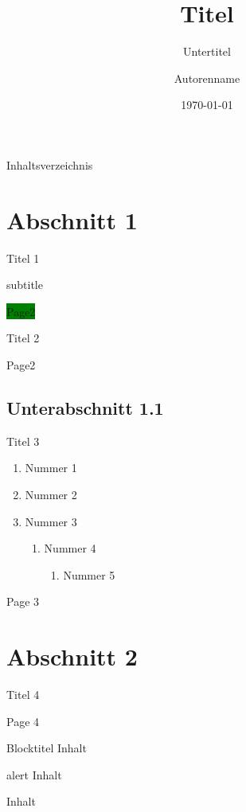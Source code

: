 \documentclass[xcolor={dvipsnames}]{beamer}
\title{Titel}
\subtitle{Untertitel}
\author{Autorenname}
\institute{Institute}
\date{\today}
\begin{document}
\begin{frame}
\titlepage
\end{frame}

\begin{frame}{\centerline{Inhaltsverzeichnis}}
\tableofcontents
\end{frame}

\section{Abschnitt 1}
\begin{frame}{\centerline{Titel 1}}{\centerline{subtitle}}
\colorbox{green}{Page2}
\end{frame}

\begin{frame}{\centerline{Titel 2}}
Page2
\end{frame}

\subsection{Unterabschnitt 1.1}

\begin{frame}{\centerline{Titel 3}}
\begin{enumerate}
\item<1-> Nummer 1
\item<2-> Nummer 2
\item<3-> Nummer 3
\begin{enumerate}
\item Nummer 4
\begin{enumerate}
\item Nummer 5
\end{enumerate}
\end{enumerate}
\end{enumerate}
Page 3
\end{frame}

\section{Abschnitt 2}
\begin{frame}{\centerline{Titel 4}}
Page 4
\begin{block}{Blocktitel}
Inhalt
\end{block}
\begin{alertblock}{alert}
Inhalt
\end{alertblock}
\begin{example}{}
Inhalt
\end{example}
\end{frame}
\end{document}
